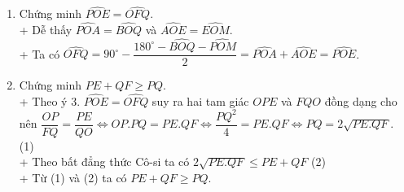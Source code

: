 \begin{bt}
{\begin{enumerate}
			+ Từ (1) và (2) ta có $CH.CO = CM.CN$.
			\item  Chứng minh $\widehat {POE} =\widehat{OFQ}$. \\
			+ Dễ thấy $\widehat{POA}=\widehat{BOQ}$ và $\widehat{AOE} = \widehat{EOM}$. \\
			+ Ta có $\widehat{OFQ} = 90^{\circ} - \dfrac{180^{\circ} - \widehat{BOQ}-  \widehat{POM}}{2} = 
			\widehat{POA} + \widehat{AOE} = \widehat{POE}$. 
			\item Chứng minh  $PE +QF \geq PQ$. \\
			+ Theo ý 3. $\widehat {POE} =\widehat{OFQ}$ suy ra hai tam giác $OPE$ và $FQO$ đồng dạng cho nên 
			$\dfrac{OP}{FQ} = \dfrac{PE}{QO} \iff  OP.PQ = PE.QF \iff \dfrac{PQ^2}{4} = PE.QF \iff PQ = 2\sqrt{PE.QF}. $
			(1) \\
			+ Theo bất đẳng thức Cô-si ta có $2\sqrt{PE.QF} \leq PE+QF$ (2) \\
			+ Từ (1) và (2) ta có $PE +QF \geq PQ$.
		\end{enumerate}
	}
\end{bt}

